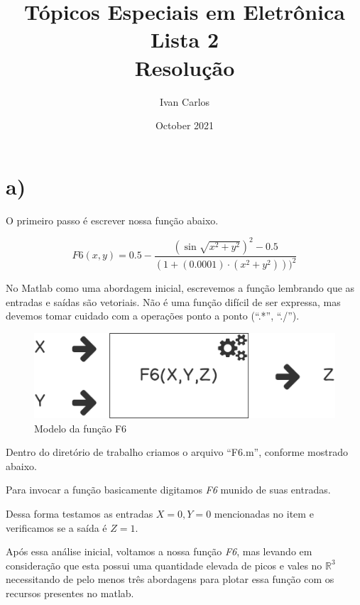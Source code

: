 \documentclass{article}
\title{%
  Tópicos Especiais em Eletrônica\\
  \large Lista 2\\
    Resolução}
\author{Ivan Carlos}
\date{October 2021}
\begin{document}
\maketitle

\section{a)}

O primeiro passo é escrever nossa função abaixo.

\begin{equation} \label{eq1}
    F6(x,y) = 0.5-\frac{(\sin\sqrt{x^2+y^2})^2 -0.5}{(1+(0.0001)\cdot (x^2+y^2)))^2}
\end{equation}

No Matlab como uma abordagem inicial, escrevemos a função
lembrando que as entradas e saídas são vetoriais. Não é uma
função difícil de ser expressa, mas devemos tomar cuidado com a
operações ponto a ponto (``.*'', ``./'').

\begin{figure}[h!]
\centering
\includegraphics[scale=.3]{images/fun.png}
\caption{Modelo da função F6}
\label{fig:func_f6_model}
\end{figure}

Dentro do diretório de trabalho criamos o arquivo ``F6.m'',
conforme mostrado abaixo.



Para invocar a função basicamente digitamos \emph{F6} munido de
suas entradas.

Dessa forma testamos as entradas $X=0, Y=0$ mencionadas no item
e verificamos se a saída é $Z=1$.



Após essa análise inicial, voltamos a nossa função \emph{F6},
mas levando em consideração que esta possui uma quantidade
elevada de picos e vales no $\mathbb{R}^3$ necessitando de pelo
menos três abordagens para plotar essa função com os recursos
presentes no matlab.
\end{document}
